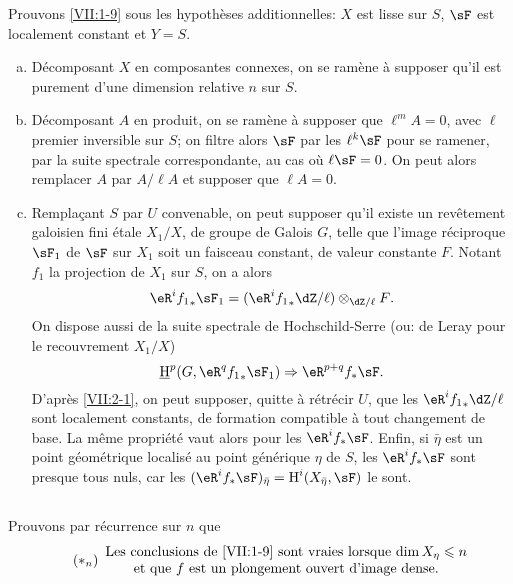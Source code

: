 Prouvons \ref{VII:1-9} sous les hypothèses additionnelles: $X$ est lisse sur 
$S$, $\sF$ est localement constant et $Y=S$. 
\begin{enumerate}[a)]
  \item Décomposant $X$ en composantes connexes, on se ramène à supposer 
    qu'il est purement d'une dimension relative $n$ sur $S$. 
  \item Décomposant $A$ en produit, on se ramène à supposer que 
    $\ell^m A=0$, avec $\ell$ premier inversible sur $S$; on filtre alors $\sF$ 
    par les $\ell^k \sF$ pour se ramener, par la suite spectrale 
    correspondante, au cas où $\ell\sF=0$. On peut alors remplacer $A$ par 
    $A/\ell A$ et supposer que $\ell A=0$. 
  \item Remplaçant $S$ par $U$ convenable, on peut supposer qu'il existe un 
    revêtement galoisien fini étale $X_1/X$, de groupe de Galois $G$, telle 
    que l'image réciproque $\sF_1$ de $\sF$ sur $X_1$ soit un faisceau 
    constant, de valeur constante $F$. Notant $f_1$ la projection de $X_1$ sur 
    $S$, on a alors 
    \[
      \eR^i {f_1}_\ast \sF_1 = (\eR^i {f_1}_\ast \dZ/\ell)\otimes_{\dZ/\ell} F \text{.} 
    \]
    On dispose aussi de la suite spectrale de Hochschild-Serre (ou: de Leray 
    pour le recouvrement $X_1/X$) 
    \[
      \underline\h^p(G,\eR^q {f_1}_\ast \sF_1) \Rightarrow \eR^{p+q} f_\ast \sF \text{.} 
    \]
    D'après \ref{VII:2-1}, on peut supposer, quitte à rétrécir $U$, que 
    les $\eR^i {f_1}_\ast \dZ/\ell$ sont localement constants, de formation 
    compatible à tout changement de base. La même propriété vaut alors 
    pour les $\eR^i f_\ast \sF$. Enfin, si $\bar\eta$ est un point 
    géométrique localisé au point générique $\eta$ de $S$, les 
    $\eR^i f_\ast\sF$ sont presque tous nuls, car les 
    $(\eR^i f_\ast \sF)_{\bar\eta} = \h^i(X_{\bar \eta},\sF)$ le sont. 
\end{enumerate}





\subsection{}\label{VII:2-3}

Prouvons par récurrence sur $n$ que 
\begin{equation*}\tag{$\ast_n$}\label{VII:eq:2-3-1}
  \begin{array}{c}
    \text{Les conclusions de \ref{VII:1-9} sont vraies lorsque $\dim{X_\eta}\leqslant n$} \\
    \text{et que $f$ est un plongement ouvert d'image dense.}
  \end{array}
\end{equation*}

